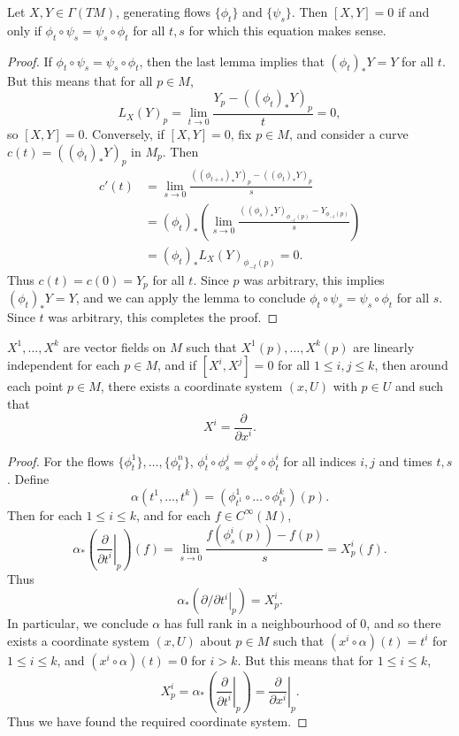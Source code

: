 \begin{theorem}
    Let $X,Y \in \Gamma(TM)$, generating flows $\{ \phi_t \}$ and $\{ \psi_s \}$. Then $[X,Y] = 0$ if and only if $\phi_t \circ \psi_s = \psi_s \circ \phi_t$ for all $t, s$ for which this equation makes sense.
\end{theorem}
\begin{proof}
    If $\phi_t \circ \psi_s = \psi_s \circ \phi_t$, then the last lemma implies that $(\phi_t)_* Y = Y$ for all $t$. But this means that for all $p \in M$,
    \[ L_X(Y)_p = \lim_{t \to 0} \frac{Y_p - ((\phi_t)_* Y)_p}{t} = 0, \]
    so $[X,Y] = 0$. Conversely, if $[X,Y] = 0$, fix $p \in M$, and consider a curve $c(t) = ((\phi_t)_* Y)_p$ in $M_p$. Then
    \begin{align*}
        c'(t) &= \lim_{s \to 0} \frac{((\phi_{t + s})_* Y)_p - ((\phi_t)_* Y)_p}{s}\\
        &= (\phi_t)_* \left( \lim_{s \to 0} \frac{((\phi_s)_* Y)_{\phi_{-t}(p)} - Y_{\phi_{-t}(p)}}{s} \right)\\
        &= (\phi_t)_* L_X(Y)_{\phi_{-t}(p)} = 0.
    \end{align*}
    Thus $c(t) = c(0) = Y_p$ for all $t$. Since $p$ was arbitrary, this implies $(\phi_t)_* Y = Y$, and we can apply the lemma to conclude $\phi_t \circ \psi_s = \psi_s \circ \phi_t$ for all $s$. Since $t$ was arbitrary, this completes the proof.
\end{proof}

\begin{corollary}
    $X^1, \dots, X^k$ are vector fields on $M$ such that $X^1(p), \dots, X^k(p)$ are linearly independent for each $p \in M$, and if $[X^i,X^j] = 0$ for all $1 \leq i,j \leq k$, then around each point $p \in M$, there exists a coordinate system $(x,U)$ with $p \in U$ and such that
    \[ X^i = \frac{\partial}{\partial x^i}. \]
\end{corollary}
\begin{proof}
    For the flows $\{ \phi^1_t \}, \dots, \{ \phi^n_t \}$, $\phi^i_t \circ \phi^j_s = \phi^j_s \circ \phi^i_t$ for all indices $i,j$ and times $t,s$. Define
    \[ \alpha(t^1, \dots, t^k) = (\phi_{t^1}^1 \circ \dots \circ \phi_{t^k}^k)(p). \]
    Then for each $1 \leq i \leq k$, and for each $f \in C^\infty(M)$,
    \[ \alpha_* \left( \left. \frac{\partial}{\partial t^i} \right|_p \right)(f) = \lim_{s \to 0} \frac{f(\phi_s^i(p)) - f(p)}{s} = X^i_p(f). \]
    Thus
    \[ \alpha_* \left(\left. \partial/\partial t^i \right|_p \right) = X^i_p. \]
    In particular, we conclude $\alpha$ has full rank in a neighbourhood of $0$, and so there exists a coordinate system $(x,U)$ about $p \in M$ such that $(x^i \circ \alpha)(t) = t^i$ for $1 \leq i \leq k$, and $(x^i \circ \alpha)(t) = 0$ for $i > k$. But this means that for $1 \leq i \leq k$,
    \[ X^i_p = \alpha_* \left( \left. \frac{\partial}{\partial t^i} \right|_p \right) = \left. \frac{\partial}{\partial x^i} \right|_p. \]
    Thus we have found the required coordinate system.
\end{proof}

